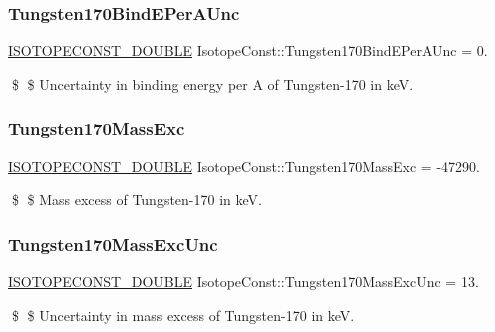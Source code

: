 \subsubsection{\texorpdfstring{Tungsten170\+Bind\+E\+Per\+A\+Unc}{Tungsten170BindEPerAUnc}}
{\footnotesize\ttfamily \mbox{\hyperlink{group___isotope_const-_macros_ga8f45a7272ce02c0b4c65c44636ed719a}{I\+S\+O\+T\+O\+P\+E\+C\+O\+N\+S\+T\+\_\+\+D\+O\+U\+B\+LE}} Isotope\+Const\+::\+Tungsten170\+Bind\+E\+Per\+A\+Unc = 0.}

\$ \$ Uncertainty in binding energy per A of Tungsten-\/170 in keV. \mbox{\label{group___isotope_const-_tungsten-_w170_ga75d927a54fac4a8fd4908f5bec078b59}} 
\subsubsection{\texorpdfstring{Tungsten170\+Mass\+Exc}{Tungsten170MassExc}}
{\footnotesize\ttfamily \mbox{\hyperlink{group___isotope_const-_macros_ga8f45a7272ce02c0b4c65c44636ed719a}{I\+S\+O\+T\+O\+P\+E\+C\+O\+N\+S\+T\+\_\+\+D\+O\+U\+B\+LE}} Isotope\+Const\+::\+Tungsten170\+Mass\+Exc = -\/47290.}

\$ \$ Mass excess of Tungsten-\/170 in keV. \mbox{\label{group___isotope_const-_tungsten-_w170_ga65351265bb313e6eba0ce9d950ea4d0f}} 
\subsubsection{\texorpdfstring{Tungsten170\+Mass\+Exc\+Unc}{Tungsten170MassExcUnc}}
{\footnotesize\ttfamily \mbox{\hyperlink{group___isotope_const-_macros_ga8f45a7272ce02c0b4c65c44636ed719a}{I\+S\+O\+T\+O\+P\+E\+C\+O\+N\+S\+T\+\_\+\+D\+O\+U\+B\+LE}} Isotope\+Const\+::\+Tungsten170\+Mass\+Exc\+Unc = 13.}

\$ \$ Uncertainty in mass excess of Tungsten-\/170 in keV. \mbox{\label{group___isotope_const-_tungsten-_w170_gab6574abcd82f5a3deadacd54ed9ae6c1}} 
